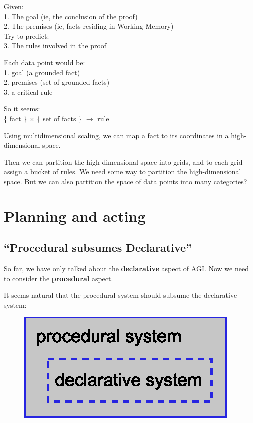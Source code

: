 \documentclass[a4paper]{report}
\begin{document}
Given:\\
1. The goal (ie, the conclusion of the proof)\\
2. The premises (ie, facts residing in Working Memory)\\
Try to predict:\\
3. The rules involved in the proof

Each data point would be:\\
1.  goal (a grounded fact)\\
2.  premises (set of grounded facts)\\
3.  a critical rule

So it seems:\\
\{ fact \} $\times$ \{ set of facts \} $\rightarrow$ rule

Using multidimensional scaling, we can map a fact to its coordinates in a high-dimensional space.

Then we can partition the high-dimensional space into grids, and to each grid assign a bucket of rules.  We need some way to partition the high-dimensional space.  But we can also partition the space of data points into many categories?

\chapter{Planning and acting}
\label{ch:planning-acting}
\minitoc

\section{``Procedural subsumes Declarative''}
\label{sec:proc-subsumes-decl}

So far, we have only talked about the \textbf{declarative} aspect of AGI.  Now we need to consider the \textbf{procedural} aspect.

It seems natural that the procedural system should subsume the declarative system:
\begin{figure}[H]
\centering
\includegraphics{Procedural-subsumes-Declarative-system.eps}
\end{figure}
\vspace{-0.5cm}
\end{document}
